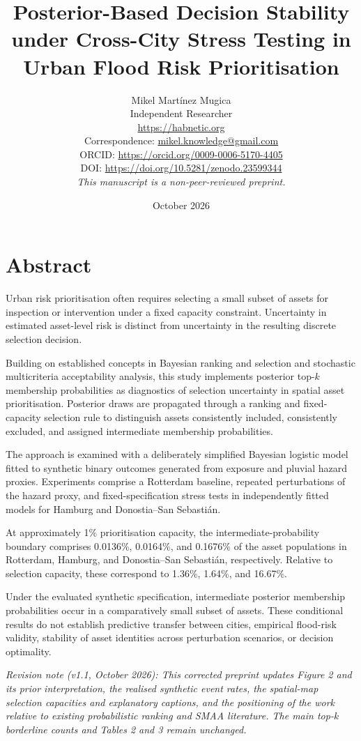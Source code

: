 \documentclass[
]{article}
\title{Posterior-Based Decision Stability under Cross-City Stress
Testing in Urban Flood Risk Prioritisation}
\author{\begin{tabular}{c}
Mikel Martínez Mugica \\
{\small Independent Researcher} \\
{\small \href{https://habnetic.org}{https://habnetic.org}} \\
{\small Correspondence: \href{mailto:mikel.knowledge@gmail.com}{mikel.knowledge@gmail.com}} \\
{\small ORCID: \href{https://orcid.org/0009-0006-5170-4405}{https://orcid.org/0009-0006-5170-4405}} \\
{\small DOI: \href{https://doi.org/10.5281/zenodo.23599344}{https://doi.org/10.5281/zenodo.23599344}} \\[0.7em]
{\small\itshape This manuscript is a non-peer-reviewed preprint.}
\end{tabular}}
\date{October 2026}
\begin{document}
\maketitle

{
\setcounter{tocdepth}{3}
\tableofcontents
}
\section{Abstract}\label{abstract}

Urban risk prioritisation often requires selecting a small subset of
assets for inspection or intervention under a fixed capacity constraint.
Uncertainty in estimated asset-level risk is distinct from uncertainty
in the resulting discrete selection decision.

Building on established concepts in Bayesian ranking and selection and
stochastic multicriteria acceptability analysis, this study implements
posterior top-\(k\) membership probabilities as diagnostics of selection
uncertainty in spatial asset prioritisation. Posterior draws are
propagated through a ranking and fixed-capacity selection rule to
distinguish assets consistently included, consistently excluded, and
assigned intermediate membership probabilities.

The approach is examined with a deliberately simplified Bayesian
logistic model fitted to synthetic binary outcomes generated from
exposure and pluvial hazard proxies. Experiments comprise a Rotterdam
baseline, repeated perturbations of the hazard proxy, and
fixed-specification stress tests in independently fitted models for
Hamburg and Donostia--San Sebastián.

At approximately 1\% prioritisation capacity, the
intermediate-probability boundary comprises 0.0136\%, 0.0164\%, and
0.1676\% of the asset populations in Rotterdam, Hamburg, and
Donostia--San Sebastián, respectively. Relative to selection capacity,
these correspond to 1.36\%, 1.64\%, and 16.67\%.

Under the evaluated synthetic specification, intermediate posterior
membership probabilities occur in a comparatively small subset of
assets. These conditional results do not establish predictive transfer
between cities, empirical flood-risk validity, stability of asset
identities across perturbation scenarios, or decision optimality.

\emph{Revision note (v1.1, October 2026): This corrected preprint
updates Figure 2 and its prior interpretation, the realised synthetic
event rates, the spatial-map selection capacities and explanatory
captions, and the positioning of the work relative to existing
probabilistic ranking and SMAA literature. The main top-\(k\) borderline
counts and Tables 2 and 3 remain unchanged.}
\end{document}
